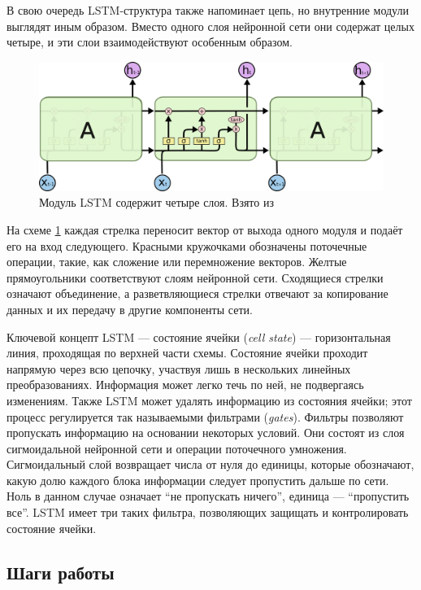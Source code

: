 \documentclass[14pt]{extarticle}
\begin{document}
В свою очередь LSTM-структура также напоминает цепь, но внутренние модули выглядят иным образом. Вместо одного слоя нейронной сети они содержат целых четыре, и эти слои взаимодействуют особенным образом. 

\begin{figure}[h]
	\centering
	\includegraphics[width=1\textwidth]{img/LSTM-chain.png}
	\caption{Модуль LSTM содержит четыре слоя. Взято из \cite{Liu2018DeepRL}}
	\label{fig:lstm}
\end{figure}

На схеме \ref{fig:lstm} каждая стрелка переносит вектор от выхода одного модуля и подаёт его на вход следующего. Красными кружочками обозначены поточечные операции, такие, как сложение или перемножение векторов. Желтые прямоугольники соответствуют слоям нейронной сети. Сходящиеся стрелки означают объединение, а разветвляющиеся стрелки отвечают за копирование данных и их передачу в другие компоненты сети.

Ключевой концепт LSTM --- состояние ячейки ({\it cell state}) --- горизонтальная линия, проходящая по верхней части схемы. Состояние ячейки проходит напрямую через всю цепочку, участвуя лишь в нескольких линейных преобразованиях. Информация может легко течь по ней, не подвергаясь изменениям. Также LSTM может удалять информацию из состояния ячейки; этот процесс регулируется так называемыми фильтрами ({\it gates}). Фильтры позволяют пропускать информацию на основании некоторых условий. Они состоят из слоя сигмоидальной нейронной сети и операции поточечного умножения. Сигмоидальный слой возвращает числа от нуля до единицы, которые обозначают, какую долю каждого блока информации следует пропустить дальше по сети. Ноль в данном случае означает “не пропускать ничего”, единица --- “пропустить все”. LSTM имеет три таких фильтра, позволяющих защищать и контролировать состояние ячейки.


\subsection{Шаги работы}
\end{document}
